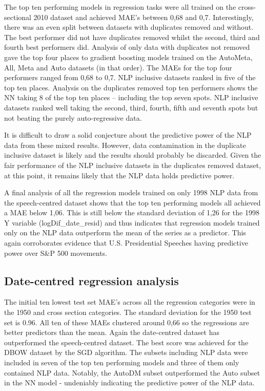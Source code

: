 \documentclass[11pt,preprint, authoryear]{elsarticle}
\numberwithin{equation}{section}
\numberwithin{figure}{section}
\numberwithin{table}{section}
\begin{document}
The top ten performing models in regression tasks were all trained on
the cross-sectional 2010 dataset and achieved MAE's between 0,68 and
0,7. Interestingly, there was an even split between datasets with
duplicates removed and without. The best performer did not have
duplicates removed whilst the second, third and fourth best performers
did. Analysis of only data with duplicates not removed gave the top four
places to gradient boosting models trained on the AutoMeta, All, Meta
and Auto datasets (in that order). The MAEs for the top four performers
ranged from 0,68 to 0,7. NLP inclusive datasets ranked in five of the
top ten places. Analysis on the duplicates removed top ten performers
shows the NN taking 8 of the top ten places -- including the top seven
spots. NLP inclusive datasets ranked well taking the second, third,
fourth, fifth and seventh spots but not beating the purely
auto-regressive data.

It is difficult to draw a solid conjecture about the predictive power of
the NLP data from these mixed results. However, data contamination in
the duplicate inclusive dataset is likely and the results should
probably be discarded. Given the fair performance of the NLP inclusive
datasets in the duplicates removed dataset, at this point, it remains
likely that the NLP data holds predictive power.

A final analysis of all the regression models trained on only 1998 NLP
data from the speech-centred dataset shows that the top ten performing
models all achieved a MAE below 1,06. This is still below the standard
deviation of 1,26 for the 1998 Y variable (logDif\_date\_resid) and thus
indicates that regression models trained only on the NLP data outperform
the mean of the series as a predictor. This again corroborates evidence
that U.S. Presidential Speeches having predictive power over S\&P 500
movements.

\hypertarget{date-centred-regression-analysis}{%
\subsection{Date-centred regression
analysis}\label{date-centred-regression-analysis}}

The initial ten lowest test set MAE's across all the regression
categories were in the 1950 and cross section categories. The standard
deviation for the 1950 test set is 0.96. All ten of these MAEs clustered
around 0,66 so the regressions are better predictors than the mean.
Again the date-centred dataset has outperformed the speech-centred
dataset. The best score was achieved for the DBOW dataset by the SGD
algorithm. The subsets including NLP data were included in seven of the
top ten performing models and three of them only contained NLP data.
Notably, the AutoDM subset outperformed the Auto subset in the NN model
- undeniably indicating the predictive power of the NLP data.
\end{document}
